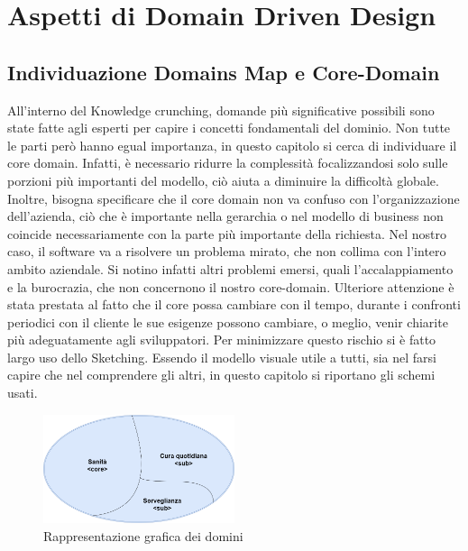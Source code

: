 \chapter{Aspetti di Domain Driven Design}

    \section{Individuazione Domains Map e Core-Domain}	
    All'interno del Knowledge crunching, domande più significative possibili sono state fatte agli esperti per capire i concetti fondamentali del dominio.
    Non tutte le parti però hanno egual importanza, in questo capitolo si cerca di individuare il core domain. Infatti, è necessario ridurre la complessità focalizzandosi solo sulle porzioni più importanti del modello, ciò aiuta a diminuire la difficoltà globale.
    Inoltre, bisogna specificare che il core domain non va confuso con l’organizzazione dell'azienda, ciò che è importante nella gerarchia o nel modello di business non coincide necessariamente con la parte più importante della richiesta. Nel nostro caso, il software va a risolvere un problema mirato, che non collima con l'intero ambito aziendale. Si notino infatti altri problemi emersi, quali l'accalappiamento e la burocrazia, che non concernono il nostro core-domain.
    Ulteriore attenzione è stata prestata al fatto che il core possa cambiare con il tempo, durante i confronti periodici con il cliente le sue esigenze possono cambiare, o meglio, venir chiarite più adeguatamente agli sviluppatori.
    Per minimizzare questo rischio si è fatto largo uso dello Sketching. Essendo il modello visuale utile a tutti, sia nel farsi capire che nel comprendere gli altri, in questo capitolo si riportano gli schemi usati.
    
    
    \begin{figure}[ht]
        \caption{Rappresentazione grafica dei domini}
        \centering
        \includegraphics[width=0.5\textwidth]{DrawIo/domainsMap.png}
    \end{figure}
    
